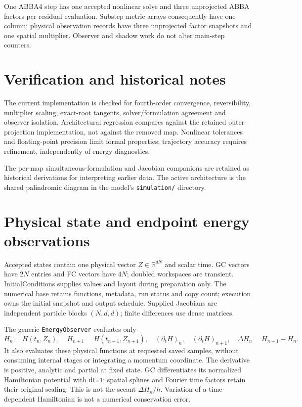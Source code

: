 \documentclass[11pt,a4paper]{article}
\begin{document}
One ABBA4 step has one accepted nonlinear solve and three unprojected ABBA
factors per residual evaluation. Substep metric arrays consequently have one
column; physical observation records have three unprojected factor snapshots
and one spatial multiplier. Observer and shadow work do not alter main-step counters.

\section{Verification and historical notes}

The current implementation is checked for fourth-order convergence,
reversibility, multiplier scaling, exact-root tangents, solver/formulation
agreement and observer isolation. Architectural regression compares against
the retained outer-projection implementation, not against the removed map.
Nonlinear tolerances and floating-point precision limit formal properties;
trajectory accuracy requires refinement, independently of energy diagnostics.

The per-map simultaneous-formulation and Jacobian companions are retained as
historical derivations for interpreting earlier data. The active architecture
is the shared palindromic diagram in the model's \texttt{simulation/} directory.

\section{Physical state and endpoint energy observations}
Accepted states contain one physical vector $Z\in\mathbb{R}^{dN}$ and scalar time.
GC vectors have $2N$ entries and FC vectors have $4N$; doubled workspaces are
transient. InitialConditions supplies values and layout during preparation only.
The numerical base retains functions, metadata, run status and copy count;
execution owns the initial snapshot and output schedule. Supplied Jacobians are
independent particle blocks $(N,d,d)$; finite differences use dense matrices.

The generic \texttt{EnergyObserver} evaluates only
\[
 H_n=H(t_n,Z_n),\quad H_{n+1}=H(t_{n+1},Z_{n+1}),\quad
 (\partial_tH)_n,\quad (\partial_tH)_{n+1},\quad
 \Delta H_n=H_{n+1}-H_n.
\]
It also evaluates these physical functions at requested saved samples, without
consuming internal stages or integrating a momentum coordinate. The derivative
is positive, analytic and partial at fixed state. GC differentiates its normalized
Hamiltonian potential with \texttt{dt=1}; spatial splines and Fourier time factors
retain their original scaling. This is not the secant $\Delta H_n/h$.
Variation of a time-dependent Hamiltonian is not a numerical conservation error.
\end{document}

